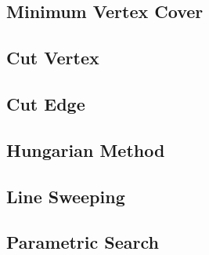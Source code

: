 \documentclass[10pt,landscape,a4paper,twocolumn]{article}
\begin{document}
\subsection{Minimum Vertex Cover}
\subsection{Cut Vertex}
\subsection{Cut Edge}
\subsection{Hungarian Method}
\subsection{Line Sweeping}
\subsection{Parametric Search}
\fi
\end{document}
